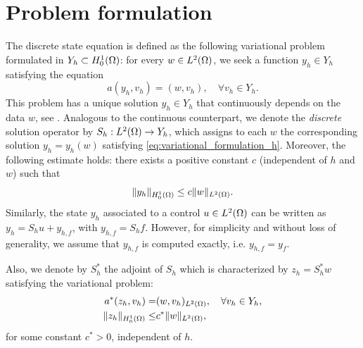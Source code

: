 \section{Problem formulation}	\label{sec:fem} 
The discrete state equation is defined as the following variational problem formulated in $Y_h \subset H_0^1(\Omega)$: for every $w\in L^2(\Omega)$, we seek a function $y_h \in Y_h$ satisfying  the equation
%
\begin{equation}\label{eq:variational_formulation_h}
a(y_h,v_h)=(w,v_h),\quad\forall v_h\in Y_h.
\end{equation}
This problem has a unique solution $y_h \in Y_h$ that continuously depends on the data $w$, see \cite{troeltzsch2010}. Analogous to the continuous counterpart, we denote the \emph{discrete} solution operator by $S_h: L^2(\Omega) \rightarrow Y_h$, which assigns to each $w$ the corresponding solution $y_h=y_h(w)$ satisfying \eqref{eq:variational_formulation_h}. Moreover, the following estimate holds: there exists a positive constant $c$ (independent of $h$ and $w$) such that 
\begin{equation*}
\lVert y_h \rVert_{H_0^1(\Omega)} \leq c \lVert w \rVert_{L^2(\Omega)}.
\end{equation*}
Similarly, the state $y_h$ associated to a control $u\in L^2(\Omega)$ can be written as $y_h = S_h u +y_{h,f}$, with $y_{h,f}=S_hf$. However, for simplicity and without loss of generality, we assume that $y_{h,f}$ is computed exactly, i.e. $y_{h,f}=y_f$. 

Also, we denote by $S_h^*$ the adjoint of $S_h$ which is characterized by $z_h = S_h^* w$ satisfying the variational problem:
\begin{subequations}\label{eq:stat*h}
    \begin{align}
a^*(z_h,v_h)=&(w,v_h)_{L^2(\Omega)}, \quad \forall v_h \in Y_h, \label{eq:variational_formulation*h}\\
\|z_h\|_{H_0^1(\Omega)} \leq & c^* \|w\|_{L^2(\Omega)}, \label{eq:ineq_state*h}
\end{align}
\end{subequations}
for some constant $c^*>0$, independent of $h$.


